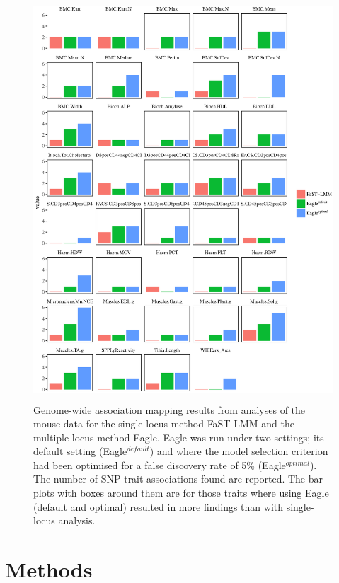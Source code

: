 \documentclass{article}
\begin{document}
\begin{figure}
\caption{Genome-wide association mapping results from analyses of the mouse data for the single-locus method FaST-LMM and the 
multiple-locus method
Eagle. Eagle was run under two settings; its default setting (Eagle$^{default}$) and where the model selection criterion had been optimised 
for a false discovery rate of 5\% (Eagle$^{optimal}$). 
The number of SNP-trait associations found are reported. The bar plots with boxes around them are for those traits where using Eagle (default and optimal)   resulted in more findings than with single-locus analysis.} 
\label{figmouse}
\begin{center}
\includegraphics[width=15cm, height=15cm]{mouseresults.eps}
\end{center}

\end{figure}




\section{Methods}
\end{document}
